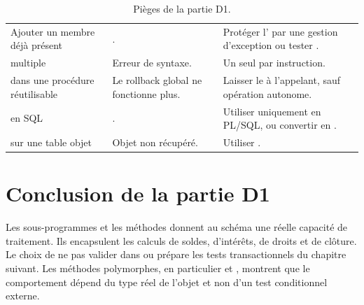\begin{table}[htbp]
  \centering
  \small
  \caption{Pièges de la partie D1.}
  \label{tab:pieges-D1}
  \begin{tabularx}{\textwidth}{@{}L{5.0cm}L{4.8cm}X@{}}
    \toprule
     &  &  \\
    \midrule
    Ajouter un membre déjà présent & . &
    Protéger l' par une gestion d'exception ou tester
    . \\
     multiple & Erreur de syntaxe. &
    Un seul  par instruction. \\
     dans une procédure réutilisable &
    Le rollback global ne fonctionne plus. &
    Laisser le  à l'appelant, sauf opération autonome. \\
     en SQL & . &
    Utiliser  uniquement en PL/SQL, ou convertir en
    . \\
     sur une table objet & Objet non récupéré. &
    Utiliser . \\
    \bottomrule
  \end{tabularx}
\end{table}

\section{Conclusion de la partie D1}

Les sous-programmes et les méthodes donnent au schéma une réelle capacité de
traitement. Ils encapsulent les calculs de soldes, d'intérêts, de droits et de
clôture. Le choix de ne pas valider dans  ou
 prépare les tests transactionnels du chapitre suivant. Les
méthodes polymorphes, en particulier  et
, montrent que le comportement dépend du type réel de
l'objet et non d'un test conditionnel externe.
